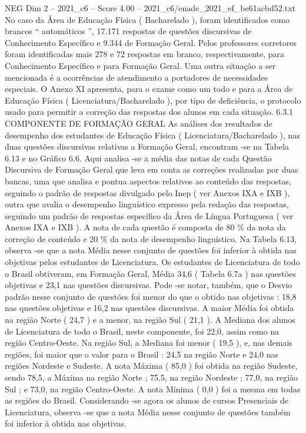 \begin{textsample}{NEG Dim 2 – 2021\_c6 – Score 4.00 – 2021\_c6/enade\_2021\_ef\_be61acbd52.txt}
No caso da Área de Educação Física ( Bacharelado ), foram identificados como brancos “ automáticos ”, 17.171 respostas de questões discursivas de Conhecimento Específico e 9.344 de Formação Geral.
Pelos professores corretores foram identificadas mais 278 e 72 respostas em branco, respectivamente, para Conhecimento Específico e para Formação Geral.
Uma outra situação a ser mencionada é a ocorrências de atendimento a portadores de necessidades especiais.
O Anexo XI apresenta, para o exame como um todo e para a Área de Educação Física ( Licenciatura/Bacharelado ), por tipo de deficiência, o protocolo usado para permitir a correção das respostas dos alunos em cada situação. 6.3.1 COMPONENTE DE FORMAÇÃO GERAL As análises dos resultados de desempenho dos estudantes de Educação Física ( Licenciatura/Bacharelado ), nas duas questões discursivas relativas a Formação Geral, encontram -se na Tabela 6.13 e no Gráfico 6.6.
Aqui analisa -se a média das notas de cada Questão Discursiva de Formação Geral que leva em conta as correções realizadas por duas bancas, uma que analisa e pontua aspectos relativos ao conteúdo das respostas, seguindo o padrão de respostas divulgado pelo Inep ( ver Anexos IXA e IXB ), outra que avalia o desempenho linguístico expresso pela redação das respostas, seguindo um padrão de respostas específico da Área de Língua Portuguesa ( ver Anexos IXA e IXB ).
A nota de cada questão é composta de 80 \% da nota da correção de conteúdo e 20 \% da nota de desempenho linguístico.
Na Tabela 6.13, observa -se que a nota Média nesse conjunto de questões foi inferior à obtida nas objetivas pelos estudantes de Licenciatura.
Os estudantes de Licenciatura de todo o Brasil obtiveram, em Formação Geral, Média 34,6 ( Tabela 6.7a ) nas questões objetivas e 23,1 nas questões discursivas.
Pode -se notar, também, que o Desvio padrão nesse conjunto de questões foi menor do que o obtido nas objetivas : 18,8 nas questões objetivas e 16,2 nas questões discursivas.
A maior Média foi obtida na região Norte ( 24,7 ) e a menor, na região Sul ( 21,1 ).
A Mediana dos alunos de Licenciatura de todo o Brasil, neste componente, foi 22,0, assim como na região Centro-Oeste.
Na região Sul, a Mediana foi menor ( 19,5 ), e, nas demais regiões, foi maior que o valor para o Brasil : 24,5 na região Norte e 24,0 nas regiões Nordeste e Sudeste.
A nota Máxima ( 85,0 ) foi obtida na região Sudeste, sendo 78,5, a Máxima na região Norte ; 75,5, na região Nordeste ; 77,0, na região Sul ; e 73,0, na região Centro-Oeste.
A nota Mínima ( 0,0 ) foi a mesma em todas as regiões do Brasil.
Considerando -se agora os alunos de cursos Presenciais de Licenciatura, observa -se que a nota Média nesse conjunto de questões também foi inferior à obtida nas objetivas.

\end{textsample}
